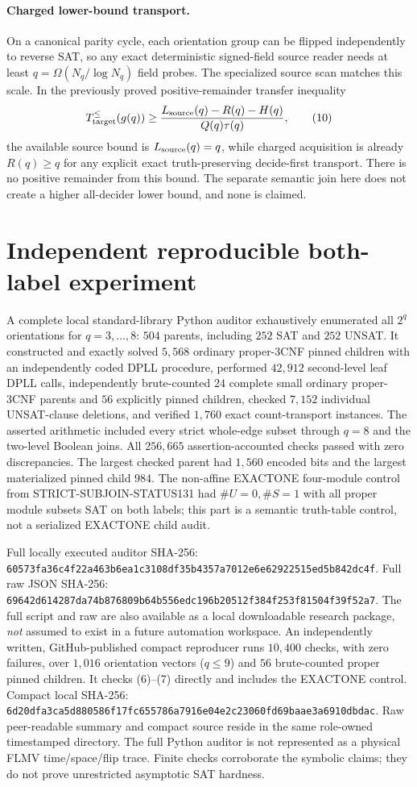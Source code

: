 \documentclass[11pt]{article}
\begin{document}
\paragraph{Charged lower-bound transport.}
On a canonical parity cycle, each orientation group can be flipped
independently to reverse SAT, so any exact deterministic signed-field
source reader needs at least $q=\Omega(N_q/\log N_q)$ field probes.
The specialized source scan matches this scale. In the previously
proved positive-remainder transfer inequality
\[
 T_{\rm target}^{\le}(g(q))
 \ge\frac{L_{\rm source}(q)-R(q)-H(q)}
 {Q(q)\tau(q)},                                      \tag{10}
\]
the available source bound is $L_{\rm source}(q)=q$,
while charged acquisition is already $R(q)\ge q$ for any
explicit exact truth-preserving decide-first transport.
There is no positive remainder from this bound. The separate
semantic join here does not create a higher all-decider lower
bound, and none is claimed.

\section{Independent reproducible both-label experiment}
A complete local standard-library Python auditor exhaustively
enumerated all $2^q$ orientations for $q=3,\ldots,8$:
$504$ parents, including $252$ SAT and $252$ UNSAT.
It constructed and exactly solved $5{,}568$ ordinary
proper-3CNF pinned children with an independently coded DPLL
procedure, performed $42{,}912$ second-level leaf DPLL calls,
independently brute-counted $24$ complete small ordinary
proper-3CNF parents and $56$ explicitly pinned children,
checked $7{,}152$ individual UNSAT-clause deletions, and
verified $1{,}760$ exact count-transport instances.
The asserted arithmetic included every strict whole-edge
subset through $q=8$ and the two-level Boolean joins.
All $256{,}665$ assertion-accounted checks passed with zero
discrepancies. The largest checked parent had $1{,}560$
encoded bits and the largest materialized pinned child $984$.
The non-affine EXACTONE four-module control from
STRICT-SUBJOIN-STATUS131 had $\#U=0,\#S=1$ with all proper
module subsets SAT on both labels; this part is a semantic
truth-table control, not a serialized EXACTONE child audit.

Full locally executed auditor SHA-256:
\texttt{60573fa36c4f22a463b6ea1c3108df35b4357a7012e6e62922515ed5b842dc4f}.
Full raw JSON SHA-256:
\texttt{69642d614287da74b876809b64b556edc196b20512f384f253f81504f39f52a7}.
The full script and raw are also available as a local downloadable
research package, \emph{not} assumed to exist in a future automation
workspace. An independently written, GitHub-published compact
reproducer runs $10{,}400$ checks, with zero failures, over
$1{,}016$ orientation vectors ($q\le9$) and $56$
brute-counted proper pinned children. It checks (6)--(7)
directly and includes the EXACTONE control.
Compact local SHA-256:
\texttt{6d20dfa3ca5d880586f17fc655786a7916e04e2c23060fd69baae3a6910dbdac}.
Raw peer-readable summary and compact source reside in the same
role-owned timestamped directory. The full Python auditor is
not represented as a physical FLMV time/space/flip trace.
Finite checks corroborate the symbolic claims; they do not
prove unrestricted asymptotic SAT hardness.
\end{document}
